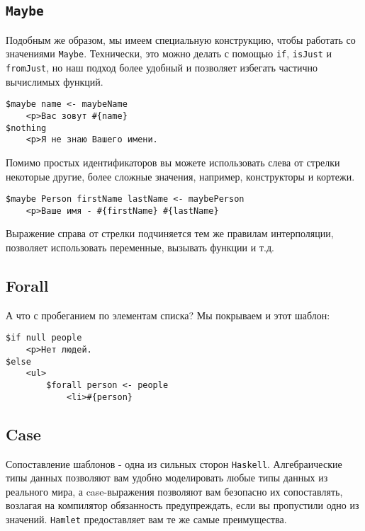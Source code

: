 \subsection{\lstinline!Maybe!}

Подобным же образом, мы имеем специальную конструкцию, чтобы работать со
значениями \lstinline!Maybe!. Технически, это можно делать с помощью
\texttt{if}, \texttt{isJust} и \texttt{fromJust}, но наш подход более удобный и
позволяет избегать частично вычислимых функций.

\begin{lstlisting}
$maybe name <- maybeName
    <p>Ваc зовут #{name}
$nothing
    <p>Я не знаю Вашего имени.
\end{lstlisting}

Помимо простых идентификаторов вы можете использовать слева от стрелки
некоторые другие, более сложные значения, например, конструкторы и кортежи.

\begin{lstlisting}
$maybe Person firstName lastName <- maybePerson
    <p>Ваше имя - #{firstName} #{lastName}
\end{lstlisting}

Выражение справа от стрелки подчиняется тем же правилам интерполяции, позволяет
использовать переменные, вызывать функции и т.д.

\subsection{Forall}

А что с пробеганием по элементам списка? Мы покрываем и этот шаблон:

\begin{lstlisting}
$if null people
    <p>Нет людей.
$else
    <ul>
        $forall person <- people
            <li>#{person}
\end{lstlisting}


\subsection{Case}

Сопоставление шаблонов - одна из сильных сторон \texttt{Haskell}.
Алгебраические типы данных позволяют вам удобно моделировать любые типы данных
из реального мира, а case-выражения позволяют вам безопасно их сопоставлять,
возлагая на компилятор обязанность предупреждать, если вы пропустили одно из
значений.  \texttt{Hamlet} предоставляет вам те же самые преимущества.


